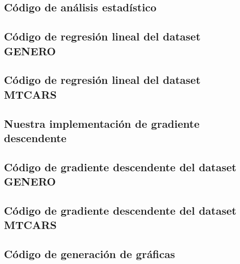 \documentclass[sigconf,authorversion,nonacm]{acmart}
\begin{document}
\begin{figure*}
  \section{Código de análisis estadístico}
  
\end{figure*}

\begin{figure*}
  \section{Código de regresión lineal del dataset GENERO}
  
\end{figure*}

\begin{figure*}
  \section{Código de regresión lineal del dataset MTCARS}
  
\end{figure*}

\begin{figure*}
  \section{Nuestra implementación de gradiente descendente}
  
\end{figure*}

\begin{figure*}
  \section{Código de gradiente descendente del dataset GENERO}
  
\end{figure*}

\begin{figure*}
  \section{Código de gradiente descendente del dataset MTCARS}
  
\end{figure*}

\begin{figure*}
  \section{Código de generación de gráficas}
  
\end{figure*}
\end{document}
